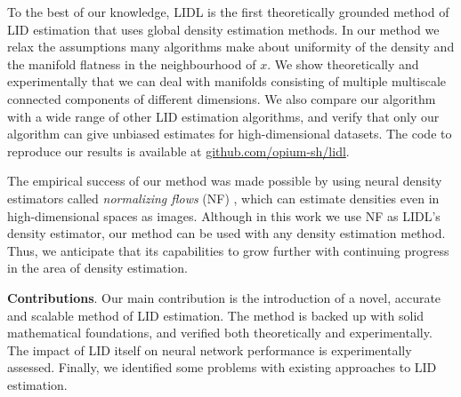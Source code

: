 To the best of our knowledge, LIDL is the first theoretically grounded method of LID estimation that uses global density estimation methods. In our method we relax the assumptions many algorithms make about uniformity of the density and the manifold flatness in the neighbourhood of $x$. We show theoretically and experimentally that we can deal with manifolds consisting of multiple multiscale connected components of different dimensions. We also compare our algorithm with a wide range of other LID estimation algorithms, and verify that only our algorithm can give unbiased estimates for high-dimensional datasets. 
The code to reproduce our results is available at \url{github.com/opium-sh/lidl}.

The empirical success of our method was made possible by using neural density estimators called \emph{normalizing flows} (NF) \citep{rezende2015variational}, which can estimate densities even in high-dimensional spaces as images. 
Although in this work we use NF as LIDL's density estimator, our method can be used with any density estimation method.
Thus, we anticipate that its capabilities to grow further with continuing progress in the area of density estimation.















\textbf{Contributions}.
Our main contribution is the introduction of a novel, accurate and scalable method of LID estimation. The method is backed up with solid mathematical foundations, and verified both theoretically and experimentally. The impact of LID itself on neural network performance is experimentally assessed. Finally, we identified some problems with existing approaches to LID estimation.


